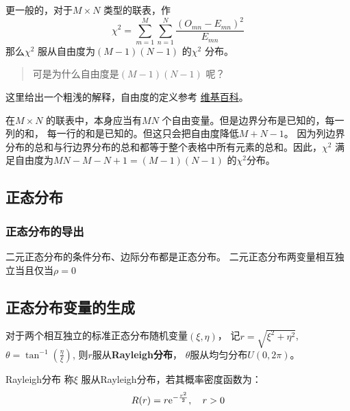 更一般的，对于\(M \times N\) 类型的联表，作\[
    \chi^{2}= \sum_{m=1}^{M} \sum_{n=1}^{N} \frac{(O_{mn} -
    E_{mn})^{2}}{E_{mn}}
\]
那么\(\chi^{2}\) 服从自由度为\((M-1)(N-1)\) 的\(\chi^{2}\) 分布。

\begin{quote}
    可是为什么自由度是\((M-1)(N-1)\) 呢？
\end{quote}

这里给出一个粗浅的解释，自由度的定义参考
\href{https://en.wikipedia.org/wiki/Degrees_of_freedom_(statistics)#Example}{维基百科}。

在\(M \times N\) 的联表中，本身应当有\(MN\) 个自由变量。但是边界分布是已知的，每一列的和，
每一行的和是已知的。但这只会把自由度降低\(M+N-1\)。
因为列边界分布的总和与行边界分布的总和都等于整个表格中所有元素的总和。因此，\(\chi^{2}\)
满足自由度为\(MN-M-N+1 = (M-1)(N-1)\) 的\(\chi^{2}\)分布。


\subsection{正态分布}

\subsubsection{正态分布的导出}
二元正态分布的条件分布、边际分布都是正态分布。
二元正态分布两变量相互独立当且仅当\(\rho=0\)

\subsection{正态分布变量的生成}
\begin{claim}{}
    对于两个相互独立的标准正态分布随机变量\((\xi, \eta)\)，
    记\(r=\sqrt{\xi^{2}+\eta^{2}}\), \(\theta =
    \tan^{-1}\left( \frac{\eta}{\xi} \right)\),
    则\(r\)服从\textbf{Rayleigh分布}，
    \(\theta\)服从均匀分布\(U(0,2\pi)\)。
\end{claim}

\begin{definition}{Rayleigh分布}
    称\(\xi\) 服从Rayleigh分布，若其概率密度函数为：
    \[
        R(r) = r\mathrm{e}^{-\frac{r^{2}}{2}}, \quad r>0
    \]
\end{definition}

